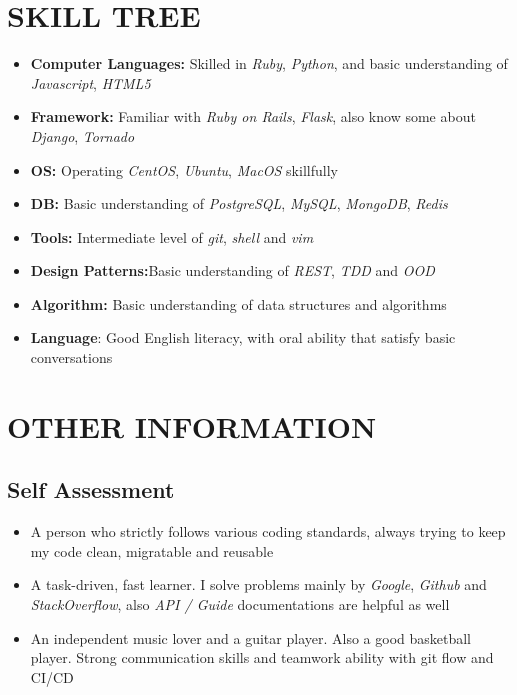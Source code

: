 \documentclass[12pt, a4paper,sans]{moderncv}       %
\begin{document}
\section{SKILL TREE}
    \begin{itemize}
        \item{\textbf{Computer Languages:} {Skilled in \textit{Ruby}, \textit{Python}, and basic understanding of \textit{Javascript}, \textit{HTML5}}}%
        \item{\textbf{Framework:} {Familiar with \textit{Ruby on Rails}, \textit{Flask}, also know some about \textit{Django}, \textit{Tornado}}}%
        \item{\textbf{OS:} {Operating \textit{CentOS}, \textit{Ubuntu}, \textit{MacOS} skillfully}}%
        \item{\textbf{DB:} {Basic understanding of \textit{PostgreSQL}, \textit{MySQL}, \textit{MongoDB}, \textit{Redis}}}%
        \item{\textbf{Tools:} {Intermediate level of \textit{git}, \textit{shell} and \textit{vim}}}%
        \item{\textbf{Design Patterns:}{Basic understanding of \textit{REST}, \textit{TDD} and \textit{OOD}}}%
        \item{ \textbf{Algorithm:} {Basic understanding of data structures and algorithms}}%
        \item{\textbf{Language}: {Good English literacy, with oral ability that satisfy basic conversations} }
    \end{itemize}

\vspace{-8pt}
\section{OTHER INFORMATION}

\subsection{Self Assessment}

    \begin{itemize}
        \item{\medium A person who strictly follows various coding standards, always trying to keep my code clean, migratable and reusable}
        \item{\medium A task-driven, fast learner. I solve problems mainly by \textit{Google}, \textit{Github} and \textit{StackOverflow}, also \textit{API / Guide} documentations are helpful as well}
        \item{\medium An independent music lover and a guitar player. Also a good basketball player. Strong communication skills and teamwork ability with git flow and CI/CD}
    \end{itemize}
\end{document}
